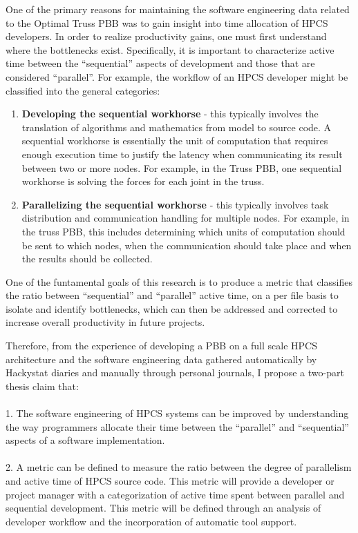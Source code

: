 One of the primary reasons for maintaining the software engineering
data related to the Optimal Truss PBB was to gain insight into time
allocation of HPCS developers.  In order to realize productivity
gains, one must first understand where the bottlenecks exist.
Specifically, it is important to characterize active time between the
``sequential'' aspects of development and those that are considered
``parallel''.  For example, the workflow of an HPCS developer might be
classified into the general categories:

\begin{enumerate}
  \item {\bf Developing the sequential workhorse} - this typically
  involves the translation of algorithms and mathematics from model to
  source code.  A sequential workhorse is essentially the unit of
  computation that requires enough execution time to justify the
  latency when communicating its result between two or more nodes.
  For example, in the Truss PBB, one sequential workhorse is solving
  the forces for each joint in the truss.
\item {\bf Parallelizing the sequential
  workhorse} - this typically involves task distribution and
  communication handling for multiple nodes.  For example, in the
  truss PBB, this includes determining which units of computation
  should be sent to which nodes, when the communication should take
  place and when the results should be collected.
\end{enumerate}

One of the funtamental goals of this research is to produce a metric
that classifies the ratio between ``sequential'' and ``parallel''
active time, on a per file basis to isolate and identify bottlenecks,
which can then be addressed and corrected to increase overall
productivity in future projects.

Therefore, from the experience of developing a PBB on a full scale HPCS
architecture and the software engineering data gathered automatically
by Hackystat diaries and manually through personal journals, I propose
a two-part thesis claim that:
\\
\\
1. The software engineering of HPCS systems can be improved by
understanding the way programmers allocate their time between the
``parallel'' and ``sequential'' aspects of a software implementation.
\\
\\
2. A metric can be defined to measure the ratio between the degree of
parallelism and active time of HPCS source code.  This metric will
provide a developer or project manager with a categorization of active
time spent between parallel and sequential development.  This metric
will be defined through an analysis of developer workflow and the
incorporation of automatic tool support.

